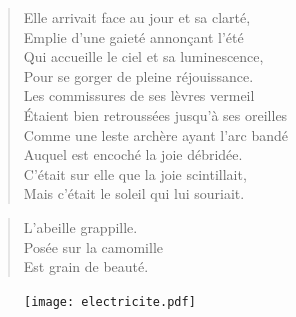 \begin{verse}\dizain
  Elle arrivait face au jour et sa clarté,\\  %
  Emplie d’une gaieté annonçant l’été\\  %
  Qui accueille le ciel et sa luminescence,\\  %
  Pour se gorger de pleine réjouissance.\\  %
  Les commissures de ses lèvres vermeil\\  %
  Étaient bien retroussées jusqu’à ses oreilles\\  %
  Comme une leste archère ayant l’arc bandé\\  %
  Auquel est encoché la joie débridée.\\  %
  C’était sur elle que la joie scintillait,\\  %
  Mais c’était le soleil qui lui souriait.
\end{verse}

\begin{verse}\haiku
  L’abeille grappille.\\  %
  Posée sur la camomille\\  %
  Est grain de beauté.
\end{verse}

\begin{figure}[h]
  \centering
  \texttt{[image: electricite.pdf]}
  \captionsetup{labelformat=empty}
  \caption[Idéotexte de l’]{}
\end{figure}

